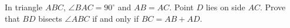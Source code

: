 In triangle $ABC$, $\angle BAC=90^\circ$ and $AB=AC$. Point $D$ lies on side $AC$. Prove that $BD$ bisects $\angle ABC$ if and only if $BC=AB+AD$.
